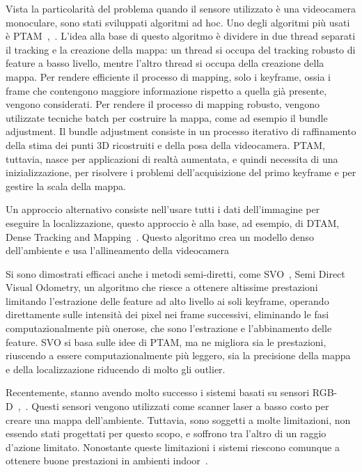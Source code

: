 Vista la particolarità del problema quando il sensore utilizzato è una videocamera monoculare, sono stati sviluppati algoritmi ad hoc.
Uno degli algoritmi più usati è PTAM~\cite{klein07parallel},~\cite{klein08improving}.
L'idea alla base di questo algoritmo è dividere in due thread separati il tracking e la creazione della mappa: un thread si occupa del tracking robusto di feature a basso livello, mentre l'altro thread si occupa della creazione della mappa. 
Per rendere efficiente il processo di mapping, solo i keyframe, ossia i frame che contengono maggiore informazione rispetto a quella già presente, vengono considerati.
Per rendere il processo di mapping robusto, vengono utilizzate tecniche batch per costruire la mappa, come ad esempio il bundle adjustment. Il bundle adjustment consiste in un processo iterativo di raffinamento della stima dei punti 3D ricostruiti e della posa della videocamera.
PTAM, tuttavia, nasce per applicazioni di realtà aumentata, e quindi necessita di una inizializzazione, per risolvere i problemi dell'acquisizione del primo keyframe e per gestire la scala della mappa.

Un approccio alternativo consiste nell'usare tutti i dati dell'immagine per eseguire la localizzazione, questo approccio è alla base, ad esempio, di DTAM, Dense Tracking and Mapping~\cite{conf/iccv/NewcombeLD11}. Questo algoritmo crea un modello denso dell'ambiente e usa l'allineamento della videocamera

Si sono dimostrati efficaci anche i metodi semi-diretti, come SVO~\cite{Forster2014ICRA}, Semi Direct Visual Odometry, un algoritmo che riesce a ottenere altissime prestazioni limitando l'estrazione delle feature ad alto livello ai soli keyframe, operando direttamente sulle intensità dei pixel nei frame successivi, eliminando le fasi computazionalmente più onerose, che sono l'estrazione e l'abbinamento delle feature. SVO si basa sulle idee di PTAM, ma ne migliora sia le prestazioni, riuscendo a essere computazionalmente più leggero, sia la precisione della mappa e della localizzazione riducendo di molto gli outlier.

Recentemente, stanno avendo molto successo i sistemi basati su sensori RGB-D~\cite{izadi2011kinectfusion},~\cite{henry2012rgb}. Questi sensori vengono utilizzati come scanner laser a basso costo per creare una mappa dell'ambiente. Tuttavia, sono soggetti a molte limitazioni, non essendo stati progettati per questo scopo, e soffrono tra l'altro di un raggio d'azione limitato. Nonostante queste limitazioni i sistemi riescono comunque a ottenere buone prestazioni in ambienti indoor~\cite{sturm2012benchmark}.

